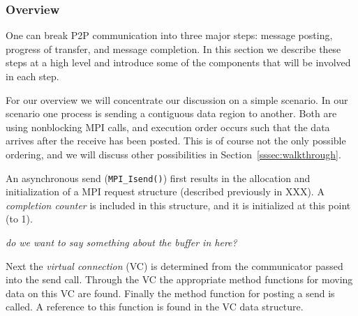 \subsubsection{Overview}

% 
% 
% 

One can break P2P communication into three major steps: message
posting, progress of transfer, and message completion.  In this section we
describe these steps at a high level and introduce some of the components that
will be involved in each step.

% 

For our overview we will concentrate our discussion on a simple scenario.  In
our scenario one process is sending a contiguous data region to another.  Both
are using nonblocking MPI calls, and execution order occurs such that the data
arrives after the receive has been posted.  This is of course not the only
possible ordering, and we will discuss other possibilities in
Section~\ref{sssec:walkthrough}.


An asynchronous send (\texttt{MPI\_Isend()}) first results in the allocation
and initialization of a MPI request structure (described previously in XXX).
A \emph{completion counter} is included in this structure, and it is
initialized at this point (to 1).
%

\emph{do we want to say something about the buffer in here?}

%
Next the \emph{virtual connection} (VC) is determined from the communicator
passed into the send call.  Through the VC the appropriate method functions
for moving data on this VC are found.
%
Finally the method function for posting a send is called.  A reference to this
function is found in the VC data structure.

